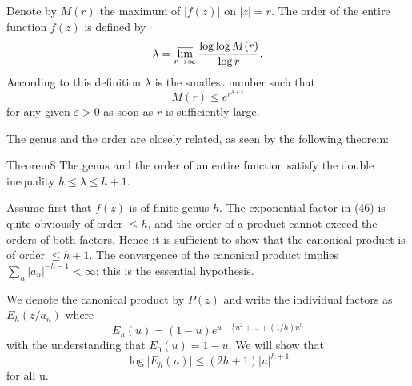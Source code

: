 Denote by $M(r)$ the maximum of $|f(z)|$ on $|z| = r$. The order of the entire function $f(z)$ is defined by
\begin{equation*}
\lambda = \varlimsup_ {r \rightarrow \infty} \frac {\log \log M (r)}{\log r}.
\end{equation*}
According to this definition $\lambda$ is the smallest number such that
\begin{equation*}
M (r) \leq e ^ {r ^ {\lambda + \epsilon}}\tag{47}\label{eq:5.47}
\end{equation*}
for any given $\varepsilon > 0$ as soon as $r$ is sufficiently large.


The genus and the order are closely related, as seen by the following theorem:

\begin{originalstatement}{Theorem}{8}\label{thm:5.8}
The genus and the order of an entire function satisfy the double inequality $h \leq \lambda \leq h + 1$.
\end{originalstatement}
Assume first that $f(z)$ is of finite genus $h$. The exponential factor in \hyperref[eq:5.46]{(46)} is quite obviously of order $\leq h$, and the order of a product cannot exceed the orders of both factors. Hence it is sufficient to show that the canonical product is of order $\leq h + 1$. The convergence of the canonical product implies $\sum_{n} |a_n|^{-h-1} < \infty$; this is the essential hypothesis.

We denote the canonical product by $P(z)$ and write the individual factors as $E_{h}(z/a_{n})$ where
\begin{equation*}
E _ {h} (u) = (1 - u) e ^ {u + \frac {1}{2} u ^ {2} + \dots + (1 / h) u ^ {h}}
\end{equation*}
with the understanding that $E_0(u) = 1 - u$. We will show that
\begin{equation*}
\log | E _ {h} (u) | \leq (2 h + 1) | u | ^ {h + 1}\tag{48}\label{eq:5.48}
\end{equation*}
for all u.

